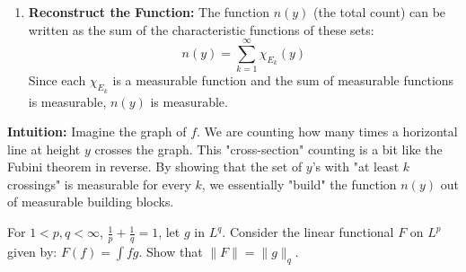 \begin{solution}
\begin{enumerate}
    \item \textbf{Reconstruct the Function:} The function $n(y)$ (the total count) can be written as the sum of the characteristic functions of these sets:
    \[ n(y) = \sum_{k=1}^\infty \chi_{E_k}(y) \]
    Since each $\chi_{E_k}$ is a measurable function and the sum of measurable functions is measurable, $n(y)$ is measurable.
\end{enumerate}

\bigskip

\textbf{Intuition:} 
Imagine the graph of $f$. We are counting how many times a horizontal line at height $y$ crosses the graph. This "cross-section" counting is a bit like the Fubini theorem in reverse. By showing that the set of $y$'s with "at least $k$ crossings" is measurable for every $k$, we essentially "build" the function $n(y)$ out of measurable building blocks.
\end{solution}

\begin{exercise}
\label{analysis:2012:5}
For $1<p,q<\infty$, $\frac{1}{p}+\frac{1}{q}=1$, let $g$ in $L^q$. Consider the linear functional $F$ on $L^p$ given by: $F(f) = \int fg$. Show that $\|F\| = \|g\|_q$.
\end{exercise}


